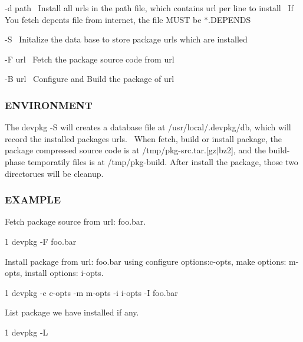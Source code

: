 {\ttfamily -\/d path}~\newline
 Install all urls in the \textquotesingle{}path\textquotesingle{} file, which contains url per line to install~\newline
 If You fetch depents file from internet, the file M\+U\+S\+T be {\ttfamily $\ast$.D\+E\+P\+E\+N\+D\+S}

{\ttfamily -\/\+S}~\newline
 Initalize the data base to store package urls which are installed

{\ttfamily -\/\+F url}~\newline
 Fetch the package source code from {\ttfamily url}

{\ttfamily -\/\+B url}~\newline
 Configure and Build the package of {\ttfamily url}

\subsubsection*{E\+N\+V\+I\+R\+O\+N\+M\+E\+N\+T}

The {\ttfamily devpkg -\/\+S} will creates a database file at {\ttfamily /usr/local/.devpkg/db}, which will record the installed package\textquotesingle{}s urls.~\newline
When {\ttfamily fetch}, {\ttfamily build} or {\ttfamily install} package, the package compressed source code is at /tmp/pkg-\/src.tar.\mbox{[}gz$\vert$bz2\mbox{]}, and the build-\/phase temporatily files is at /tmp/pkg-\/build. After install the package, those two directorues will be cleanup.

\subsubsection*{E\+X\+A\+M\+P\+L\+E}

Fetch package source from url\+: {\ttfamily foo.\+bar}. 
\begin{DoxyCode}
1 devpkg -F foo.bar
\end{DoxyCode}


Install package from url\+: {\ttfamily foo.\+bar} using configure options\+:{\ttfamily c-\/opts}, make options\+: {\ttfamily m-\/opts}, install options\+: {\ttfamily i-\/opts}. 
\begin{DoxyCode}
1 devpkg -c c-opts -m m-opts -i i-opts -I foo.bar
\end{DoxyCode}


List package we have installed if any. 
\begin{DoxyCode}
1 devpkg -L
\end{DoxyCode}


